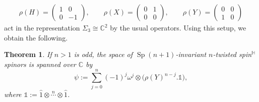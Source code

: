 \documentclass[pdftex]{sigma}
\numberwithin{equation}{section}
\newtheorem{Theorem}{Theorem}[section]
\newcommand{\C}{\mathbb{C}} %
\DeclareMathOperator{\Sp}{Sp}
\begin{document}
		\begin{align}\label{sp1repstandardmatrices}
			\rho(H)=\begin{pmatrix}
				1&0 \\ 0&-1
			\end{pmatrix},\qquad 	\rho(X)= \begin{pmatrix}
				0& 1\\ 0& 0
			\end{pmatrix} , \qquad \rho(Y)= \begin{pmatrix}
				0&0\\ 1&0
			\end{pmatrix}
		\end{align}
		act in the representation $\Sigma_3\cong \C^2$ by the usual operators. Using this setup, we obtain the following.

		\begin{Theorem}\label{HPn_twisted_inv_spinor_basis} If $n>1$ is odd, the space of $\Sp(n+1)$-invariant $n$-twisted spin$^{\mathbb{H}}$ spinors is spanned over $\C$ by \[\psi:= \sum_{j=0}^{n} (-1)^{j} \omega^j \otimes \bigl(\rho(Y)^{n-j}.\mathds{1}\bigr) , \]
			where $\mathds{1}:=\hat{1} \otimes \overset{n}{\cdots} \otimes \hat{1}$.
		\end{Theorem}
\end{document}
